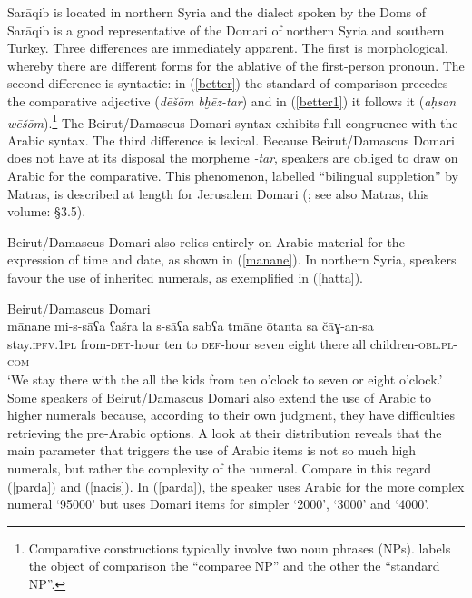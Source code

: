 \documentclass[output=paper]{langsci/langscibook}
\begin{document}
Sarāqib is located in northern Syria and the dialect spoken by the Doms of Sarāqib is a good representative of the Domari of northern Syria and southern Turkey. Three differences are immediately apparent. The first is morphological, whereby there are different forms for the ablative of the first-person pronoun. The second difference is syntactic: in (\ref{better}) the standard of comparison precedes the comparative adjective (\textit{dēšōm} \textit{bḫēz-tar}) and in (\ref{better1}) it follows it (\textit{aḥsan} \textit{wēšōm}).\footnote{Comparative constructions typically involve two noun phrases (NPs). \citet{Stassen2013} labels the object of comparison the “comparee NP” and the other the “standard NP”.} The Beirut/Damascus Domari syntax exhibits full congruence with the Arabic syntax. The third difference is lexical. Because Beirut/Damascus Domari does not have at its disposal the morpheme \textit{{}-tar}, speakers are obliged to draw on Arabic for the comparative. This phenomenon, labelled ``bilingual suppletion'' by Matras, is described at length for Jerusalem Domari (\citealt[379--382]{Matras2012}; see also Matras, this volume: §3.5).

Beirut/Damascus Domari also relies entirely on Arabic material for the expression of time and date, as shown in (\ref{manane}). In northern Syria, speakers favour the use of inherited numerals, as exemplified in (\ref{hatta}).

\ea
{Beirut/Damascus Domari}\\ \label{manane}
\gll mānane mi-s-sāʕa ʕašra la s-sāʕa sabʕa tmāne ōtanta sa čāɣ-an-sa\\
     stay.\textsc{ipfv.1pl} from-\textsc{det}{}-hour ten to \textsc{def}{}-hour seven eight there all children-\textsc{obl.pl-com}\\
   \glt ‘We stay there with the all the kids from ten o'clock to seven or eight o'clock.’\\
\z
{}
Some speakers of Beirut/Damascus Domari also extend the use of Arabic to higher numerals because, according to their own judgment, they have difficulties retrieving the pre-Arabic options. A look at their distribution reveals that the main parameter that triggers the use of Arabic items is not so much high numerals, but rather the complexity of the numeral. Compare in this regard (\ref{parda}) and (\ref{nacis}). In (\ref{parda}), the speaker uses Arabic for the more complex numeral ‘95000’ but uses Domari items for simpler `2000', `3000' and `4000'.
\end{document}
